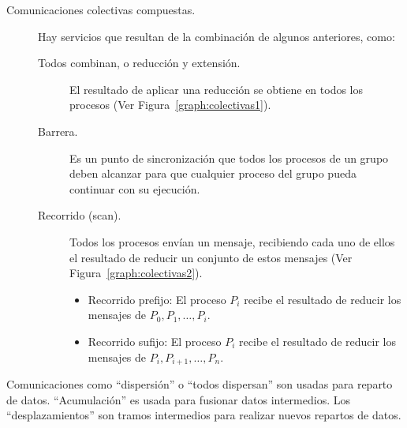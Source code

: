 \begin{description}
    \item [Comunicaciones colectivas compuestas.] Hay servicios que resultan de la combinación de algunos anteriores, como:
        \begin{description}
            \item [Todos combinan, o reducción y extensión.] El resultado de aplicar una reducción se obtiene en todos los procesos (Ver Figura~\ref{graph:colectivas1}).
            \item [Barrera.] Es un punto de sincronización que todos los procesos de un grupo deben alcanzar para que cualquier proceso del grupo pueda continuar con su ejecución.
            \item [Recorrido (scan).] Todos los procesos envían un mensaje, recibiendo cada uno de ellos el resultado de reducir un conjunto de estos mensajes (Ver Figura~\ref{graph:colectivas2}).
                \begin{itemize}
                    \item Recorrido prefijo: El proceso $P_i$ recibe el resultado de reducir los mensajes de $P_0, P_1, \ldots, P_i$.
                    \item Recorrido sufijo: El proceso $P_i$ recibe el resultado de reducir los mensajes de $P_i, P_{i+1}, \ldots, P_n$.
                \end{itemize}
        \end{description}
\end{description}

Comunicaciones como ``dispersión'' o ``todos dispersan'' son usadas para reparto de datos. ``Acumulación'' es usada para fusionar datos intermedios. Los ``desplazamientos'' son tramos intermedios para realizar nuevos repartos de datos.\\


